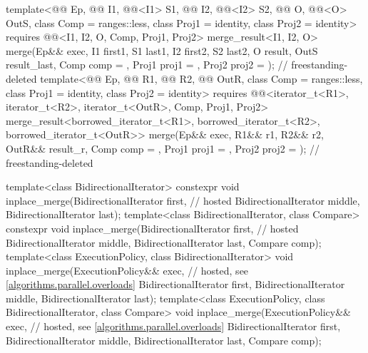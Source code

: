 \begin{codeblock}
{{    template<@@ Ep, @@ I1, @@<I1> S1,
             @@ I2, @@<I2> S2,
             @@ O, @@<O> OutS, class Comp = ranges::less,
             class Proj1 = identity, class Proj2 = identity>
      requires @@<I1, I2, O, Comp, Proj1, Proj2>
      merge_result<I1, I2, O>
        merge(Ep&& exec, I1 first1, S1 last1, I2 first2, S2 last2, O result, OutS result_last,
              Comp comp = {}, Proj1 proj1 = {}, Proj2 proj2 = {});          // freestanding-deleted
    template<@@ Ep, @@ R1, @@ R2,
             @@ OutR, class Comp = ranges::less,
             class Proj1 = identity, class Proj2 = identity>
      requires @@<iterator_t<R1>, iterator_t<R2>, iterator_t<OutR>, Comp, Proj1, Proj2>
      merge_result<borrowed_iterator_t<R1>, borrowed_iterator_t<R2>, borrowed_iterator_t<OutR>>
        merge(Ep&& exec, R1&& r1, R2&& r2, OutR&& result_r,
              Comp comp = {}, Proj1 proj1 = {}, Proj2 proj2 = {});          // freestanding-deleted
  }

  template<class BidirectionalIterator>
    constexpr void inplace_merge(BidirectionalIterator first,   // hosted
                                 BidirectionalIterator middle,
                                 BidirectionalIterator last);
  template<class BidirectionalIterator, class Compare>
    constexpr void inplace_merge(BidirectionalIterator first,   // hosted
                                 BidirectionalIterator middle,
                                 BidirectionalIterator last, Compare comp);
  template<class ExecutionPolicy, class BidirectionalIterator>
    void inplace_merge(ExecutionPolicy&& exec,                  // hosted, see \ref{algorithms.parallel.overloads}
                       BidirectionalIterator first,
                       BidirectionalIterator middle,
                       BidirectionalIterator last);
  template<class ExecutionPolicy, class BidirectionalIterator, class Compare>
    void inplace_merge(ExecutionPolicy&& exec,                  // hosted, see \ref{algorithms.parallel.overloads}
                       BidirectionalIterator first,
                       BidirectionalIterator middle,
                       BidirectionalIterator last, Compare comp);

}
\end{codeblock}
